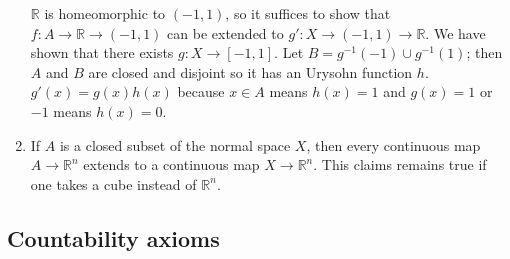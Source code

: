 \documentclass{article}
\begin{document}
\begin{enumerate}
\(\mathbb{R}\) is homeomorphic to \((-1,1)\), so it suffices to show that \(f:A\to\mathbb{R}\to(-1,1)\) can be extended to \(g':X\to(-1,1)\to\mathbb{R}\). 
We have shown that there exists \(g:X\to [-1,1]\). Let \(B=g^{-1}(-1)\cup g^{-1}(1)\); then \(A\) and \(B\) are closed and disjoint so it has an Urysohn function \(h\). \(g'(x)=g(x)h(x)\) because \(x\in A\) means \(h(x)=1\) and \(g(x)=1\) or \(-1\) means \(h(x)=0\).
\item If \(A\) is a closed subset of the normal space \(X\), then every continuous map \(A\to \mathbb{R}^{n}\) extends to a continuous map \(X\to \mathbb{R}^{n}\). This claims remains true if one takes a cube instead of \(\mathbb{R}^{n}\).
\end{enumerate}
\subsection{Countability axioms}
\end{document}
